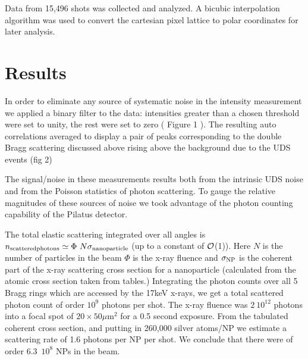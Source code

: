\documentclass [11pt,fleqn]{article}
\begin{document}
Data from 15,496 shots was collected and analyzed. A bicubic interpolation algorithm was used to convert the cartesian pixel lattice to polar coordinates for later analysis.

\section{Results}


In order to eliminate any source of systematic noise in the intensity measurement
we applied a binary  filter to the data: intensities greater than a chosen threshold
were set to unity, the rest were set to zero ( Figure 1 ). The resulting auto correlations averaged to display a pair of peaks corresponding to the double Bragg scattering discussed above rising above the background due to the UDS events (fig 2)

The signal/noise in these measurements results both from the intrinsic UDS noise and from the Poisson statistics of photon scattering. To gauge the relative magnitudes of these sources of noise we took advantage of the photon counting capability of the Pilatus detector. 

The total elastic scattering integrated over all angles is $n_{\rm scattered photons}\simeq\Phi\ N \sigma_{\rm nanoparticle}$ (up to a constant of $\cal O$(1)). Here $N$ is the number of particles in the beam $\Phi$ is the x-ray fluence and $\sigma_{\rm NP}$ is the coherent part of the x-ray scattering cross section for a nanoparticle (calculated from the atomic cross section taken from tables.) Integrating the photon counts over all 5 Bragg rings which are accessed by the 17keV x-rays, we get a total scattered photon count of order $10^9$ photons per shot. The x-ray fluence was $2\ 10^{12}$ photons into a focal spot of $20 \times 50 \mu$m$^2$ for a 0.5 second exposure. From the tabulated coherent cross section, and putting in 260,000 silver atoms/NP we estimate a scattering rate of 1.6 photons per NP per shot. We conclude that there were of order 6.3\ $10^8$ NPs in the beam.
\end{document}
